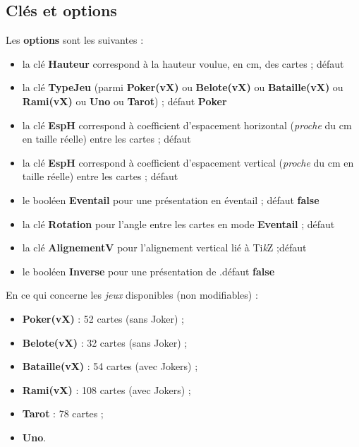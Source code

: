 \documentclass{article}
\providecommand\tikzlogo{Ti\textit{k}Z}
\let\TikZ\tikzlogo
\newcommand\Cle[1]{{\bfseries\sffamily\textlangle #1\textrangle}}
\begin{document}
{{{{{{{{{\begin{codetex}[]
\end{codetex}

\subsection{Clés et options}

\begin{codecles}
Les \Cle{options} sont les suivantes :

\begin{itemize}
	\item la clé \Cle{Hauteur} correspond à la hauteur voulue, en cm, des cartes ; \hfill{}défaut \Cle{4.25}
	\item la clé \Cle{TypeJeu} (parmi \Cle{Poker(vX)} ou \Cle{Belote(vX)} ou \Cle{Bataille(vX)} ou \Cle{Rami(vX)} ou \Cle{Uno} ou \Cle{Tarot}) ; \hfill{}défaut \Cle{Poker}
	\item la clé \Cle{EspH} correspond à coefficient d'espacement horizontal (\textit{proche} du cm en taille réelle) entre les cartes ; \hfill{}défaut \Cle{1}
	\item la clé \Cle{EspH} correspond à coefficient d'espacement vertical (\textit{proche} du cm en taille réelle) entre les cartes ; \hfill{}défaut \Cle{0}
	\item le booléen \Cle{Eventail} pour une présentation en éventail ; \hfill{}défaut \Cle{false}
	\item la clé \Cle{Rotation} pour l'angle entre les cartes en mode \Cle{Eventail}  ; \hfill{}défaut \Cle{10}
	\item la clé \Cle{AlignementV} pour l'alignement vertical lié à \TikZ{} ;\hfill{}défaut \Cle{0.5}
	\item le booléen \Cle{Inverse} pour une présentation de .\hfill{}défaut \Cle{false}
\end{itemize}
\end{codecles}

\begin{codeinfo}
En ce qui concerne les \textit{jeux} disponibles (non modifiables) :

\begin{itemize}
	\item \Cle{Poker(vX)} : 52 cartes (sans Joker) ;
	\item \Cle{Belote(vX)} : 32 cartes (sans Joker) ;
	\item \Cle{Bataille(vX)} : 54 cartes (avec Jokers) ;
	\item \Cle{Rami(vX)} : 108 cartes (avec Jokers) ;
	\item \Cle{Tarot} : 78 cartes ;
	\item \Cle{Uno}.
\end{itemize}
\end{codeinfo}

}}}}}}}}}
\end{document}
